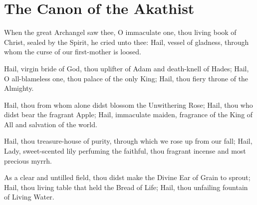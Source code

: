 \documentclass[twoside, letterpaper, 12pt]{report}
\begin{document}




\readerline{}

\chapter*{The Canon of the Akathist}



When the great Archangel saw thee, O immaculate one,
thou living book of Christ, sealed by the Spirit, he cried unto thee:
Hail, vessel of gladness, through whom the curse of our first-mother is loosed.


Hail, virgin bride of God, thou uplifter of Adam and death-knell of Hades;
Hail, O all-blameless one, thou palace of the only King; Hail,
thou fiery throne of the Almighty.


Hail, thou from whom alone didst blossom the Unwithering Rose;
Hail, thou who didst bear the fragrant Apple;
Hail, immaculate maiden, fragrance of the King of All and salvation of the world.


Hail, thou treasure-house of purity, through which we rose up from our fall;
Hail, Lady, sweet-scented lily perfuming the faithful,
thou fragrant incense and most precious myrrh.





As a clear and untilled field, thou didst make the Divine Ear of Grain to sprout;
Hail, thou living table that held the Bread of Life;
Hail, thou unfailing fountain of Living Water.
\end{document}
